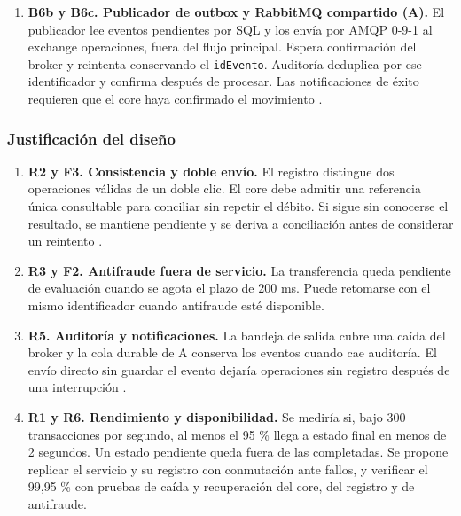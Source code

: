 \documentclass[12pt,a4paper]{article}
\begin{document}
\begin{enumerate}
    \item \textbf{B6b y B6c. Publicador de outbox y RabbitMQ compartido (A).}
    El publicador lee eventos pendientes por SQL y los envía por AMQP 0-9-1 al exchange operaciones, fuera del flujo principal. Espera confirmación del broker y reintenta conservando el \texttt{idEvento}. Auditoría deduplica por ese identificador y confirma después de procesar. Las notificaciones de éxito requieren que el core haya confirmado el movimiento \cite{awsoutbox}.

\end{enumerate}

\subsubsection{Justificación del diseño}

\begin{enumerate}
    \item \textbf{R2 y F3. Consistencia y doble envío.}
    El registro distingue dos operaciones válidas de un doble clic. El core debe admitir una referencia única consultable para conciliar sin repetir el débito. Si sigue sin conocerse el resultado, se mantiene pendiente y se deriva a conciliación antes de considerar un reintento \cite{featonbyretries}.

    \item \textbf{R3 y F2. Antifraude fuera de servicio.}
    La transferencia queda pendiente de evaluación cuando se agota el plazo de 200 ms. Puede retomarse con el mismo identificador cuando antifraude esté disponible.

    \item \textbf{R5. Auditoría y notificaciones.}
    La bandeja de salida cubre una caída del broker y la cola durable de A conserva los eventos cuando cae auditoría. El envío directo sin guardar el evento dejaría operaciones sin registro después de una interrupción \cite{awsoutbox}.

    \item \textbf{R1 y R6. Rendimiento y disponibilidad.}
    Se mediría si, bajo 300 transacciones por segundo, al menos el 95 \% llega a estado final en menos de 2 segundos. Un estado pendiente queda fuera de las completadas. Se propone replicar el servicio y su registro con conmutación ante fallos, y verificar el 99,95 \% con pruebas de caída y recuperación del core, del registro y de antifraude.

\end{enumerate}
\end{document}

